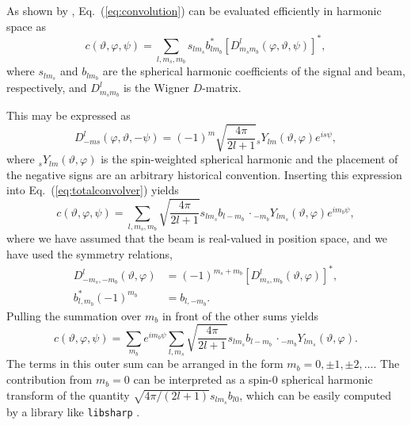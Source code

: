 \documentclass[twocolumn]{aa}
\newcommand{\cvar}{\ensuremath{c(\vartheta, \varphi, \psi)}}
\begin{document}
As shown by \citet{Wandelt:2001}, Eq.~(\ref{eq:convolution}) can be
evaluated efficiently in harmonic space as
\begin{equation}
\cvar = \sum_{l,m_s,m_b} s_{lm_s} b^\ast_{lm_b}
[D^{l}_{m_sm_b}(\varphi,\vartheta,\psi)]^\ast,
\label{eq:totalconvolver}
\end{equation}
where $s_{lm_s}$ and $b_{lm_b}$ are the spherical harmonic
coefficients of the signal and beam, respectively, and
$D^{l}_{m_sm_b}$ is the Wigner $D$-matrix.

This may be expressed as \citep{goldberg}
\begin{equation}
D^l_{-ms}(\varphi,\vartheta,-\psi) = (-1)^m\sqrt{\frac{4\pi}{2l+1}}
{}_sY_{lm}(\vartheta,\varphi) e^{is\psi},
\end{equation}
where ${}_sY_{lm}(\vartheta,\varphi)$ is the spin-weighted
spherical harmonic and the placement of the negative signs are an arbitrary historical convention. Inserting this expression into
Eq.~(\ref{eq:totalconvolver}) yields
\begin{equation}
\cvar = \sum_{l,m_s,m_b}\sqrt{\frac{4\pi}{2l+1}} s_{lm_s} b_{l-m_b}\, \cdot {}_{-m_b}Y_{lm_s}(\vartheta,\varphi) e^{im_b\psi},
\end{equation}
where we have assumed that the beam is real-valued in position space,
and we have used the symmetry relations,
\begin{align}
  D^l_{-m_s,-m_b}(\vartheta,\varphi)&=(-1)^{m_s+m_b}[D^{l}_{m_s,m_b}(\vartheta,\varphi)]^\ast,\\
  b^\ast_{l,m_b} (-1)^{m_b}&=b_{l,-m_b}.\label{eq:breal}
\end{align}
Pulling the summation over $m_b$ in front of the other sums yields
\begin{equation}
\cvar = \sum_{m_b} e^{im_b\psi} \sum_{l,m_s} \sqrt{\frac{4\pi}{2l+1}}
s_{lm_s} b_{l-m_b}\, \cdot {}_{-m_b}Y_{lm_s}(\vartheta,\varphi).
\label{eq:c_m}
\end{equation}
The terms in this outer sum can be arranged in the form $m_b=0, \pm 1, \pm 2, \dots$.
The contribution from \mbox{$m_b=0$} can be interpreted as a spin-0
spherical harmonic transform of the quantity $\sqrt{4\pi/(2l+1)}
s_{lm_s} b_{l0}$, which can be easily computed by a library like
\texttt{libsharp} \citep{libsharp}.
\end{document}
